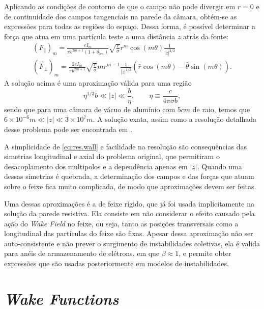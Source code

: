 Aplicando as condições de contorno de que o campo não pode divergir em $r=0$ e de continuidade dos campos tangenciais na parede da câmara, obtém-se as expressões para todas as regiões do espaço. Dessa forma, é possível determinar a força que atua em uma partícula teste a uma distância $z$ atrás da fonte:
\begin{align}\nonumber \label{eq:res.wall}
(F_\lVert)_m = \frac{eI_m}{\pi b^{2m+1}(1+\delta_{0m})}
\sqrt{\frac{c}{\sigma}}r^m \cos(m\theta) \frac{1}{|z|^{3/2}}\\
(\vec{F}_\perp)_m = \frac{2eI_m}{\pi b^{2m+1}} \sqrt{\frac{c}{\sigma}}
m r^{m-1} \frac{1}{|z|^{1/2}} \left(\hat{r}\cos(m\theta) -\hat{\theta}
\sin(m\theta)\right).
\end{align}
A solução acima é uma aproximação válida para uma região
\begin{displaymath}
\eta^{1/3}b\ll|z|\ll \frac{b}{\eta}, \qquad \eta \equiv \frac{c}{4\pi \sigma b},
\end{displaymath}
sendo que para uma câmara de vácuo de alumínio com $5 cm$ de raio, temos que $6\times10^{-6} m\ll |z| \ll 3\times10^7 m$. A solução exata, assim como a resolução detalhada desse problema pode ser encontrada em \cite{Chao}.

A simplicidade de \eqref{eq:res.wall} e facilidade na resolução são consequências das simetrias longitudinal e axial do problema original, que permitiram o desacoplamento dos multipolos e a dependência apenas em $|z|$. Quando uma dessas simetrias é quebrada, a determinação dos campos e das forças que atuam sobre o feixe fica muito complicada, de modo que aproximações devem ser feitas.

Uma dessas aproximações é a de feixe rígido, que já foi usada implicitamente na solução da parede resistiva. Ela consiste em não considerar o efeito causado pela ação do \textit{Wake Field} no feixe, ou seja, tanto as posições transversais como a longitudinal das partículas do feixe são fixas. Apesar dessa aproximação não ser auto-consistente e não prever o surgimento de instabilidades coletivas, ela é valida para anéis de armazenamento de elétrons, em que $\beta \approx 1$, e permite obter expressões  que são usadas posteriormente em modelos de instabilidades.

\section{\textit{Wake Functions}}


